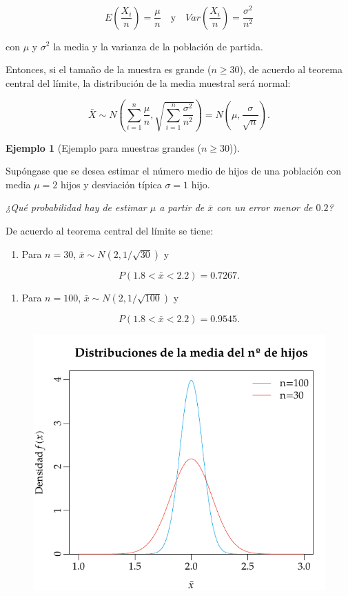\documentclass[
  a4paper,
]{scrreport}
\providecommand{\tightlist}{%
  \setlength{\itemsep}{0pt}\setlength{\parskip}{0pt}}\usepackage{longtable,booktabs,array}
\theoremstyle{plain}
\theoremstyle{definition}
\newtheorem{example}{Ejemplo}[chapter]
\theoremstyle{definition}
\theoremstyle{remark}
\begin{document}
\[
E\left(\frac{X_i}{n}\right) =\frac{\mu}{n} \quad  \mbox{y} \quad Var\left(\frac{X_i}{n}\right) = \frac{\sigma^2}{n^2}
\]

con \(\mu\) y \(\sigma^2\) la media y la varianza de la población de
partida.

Entonces, si el tamaño de la muestra es grande (\(n\geq 30\)), de
acuerdo al teorema central del límite, la distribución de la media
muestral será normal:

\[
\bar X \sim N\left(\sum_{i=1}^n \frac{\mu}{n},\sqrt{\sum_{i=1}^n \frac{\sigma^2}{n^2}} \right) = N\left(\mu,\frac{\sigma}{\sqrt{n}} \right).
\]

\begin{example}[Ejemplo para muestras grandes
(\(n\geq 30\))]\protect\hypertarget{exm-distribucion-media-muestras-grandes}{}\label{exm-distribucion-media-muestras-grandes}

Supóngase que se desea estimar el número medio de hijos de una población
con media \(\mu=2\) hijos y desviación típica \(\sigma=1\) hijo.

\emph{¿Qué probabilidad hay de estimar \(\mu\) a partir de \(\bar x\)
con un error menor de \(0.2\)?}

De acuerdo al teorema central del límite se tiene:

\begin{enumerate}
\def\labelenumi{\arabic{enumi}.}
\tightlist
\item
  Para \(n=30\), \(\bar x\sim N(2,1/\sqrt{30})\) y
\end{enumerate}

\[
P(1.8<\bar x<2.2) = 0.7267.
\]

\begin{enumerate}
\def\labelenumi{\arabic{enumi}.}
\tightlist
\item
  Para \(n=100\), \(\bar x\sim N(2,1/\sqrt{100})\) y
\end{enumerate}

\[
P(1.8<\bar x<2.2) = 0.9545.
\]

\begin{figure}

{\centering \includegraphics{img/estimacion/teorema-central-limite.pdf}

}
\end{figure}
\end{example}
\end{document}
